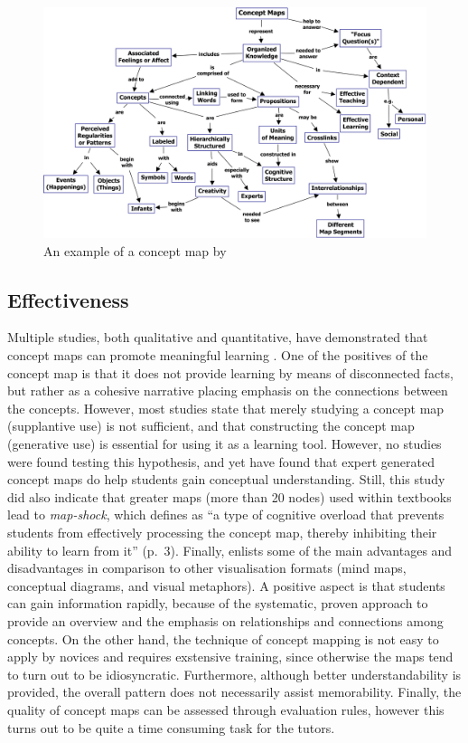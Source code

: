 \begin{figure}
    \centering
    \includegraphics[width=\textwidth]{img/conceptmap.png}
    \caption{An example of a concept map by \protect{}}
    \label{fig:conceptmap}
\end{figure}

\subsection{Effectiveness}

Multiple studies, both qualitative and quantitative, have demonstrated that concept maps can promote meaningful learning \cite{canas, hwang2, nesbit, subramaniam, singh}. One of the positives of the concept map is that it does not provide learning by means of disconnected facts, but rather as a cohesive narrative placing emphasis on the connections between the concepts. However, most studies state that merely studying a concept map (supplantive use) is not sufficient, and that constructing the concept map (generative use) is essential for using it as a learning tool. However, no studies were found testing this hypothesis, and yet  have found that expert generated concept maps do help students gain conceptual understanding. Still, this study did also indicate that greater maps (more than 20 nodes) used within textbooks lead to \emph{map-shock}, which  defines as ``a type of cognitive overload that prevents students from effectively processing the concept map, thereby inhibiting their ability to learn from it'' (p.~3). Finally,  enlists some of the main advantages and disadvantages in comparison to other visualisation formats (mind maps, conceptual diagrams, and visual metaphors). A positive aspect is that students can gain information rapidly, because of the systematic, proven approach to provide an overview and the emphasis on relationships and connections among concepts. On the other hand, the technique of concept mapping is not easy to apply by novices and requires exstensive training, since otherwise the maps tend to turn out to be idiosyncratic. Furthermore, although better understandability is provided, the overall pattern does not necessarily assist memorability. Finally, the quality of concept maps can be assessed through evaluation rules, however this turns out to be quite a time consuming task for the tutors.

